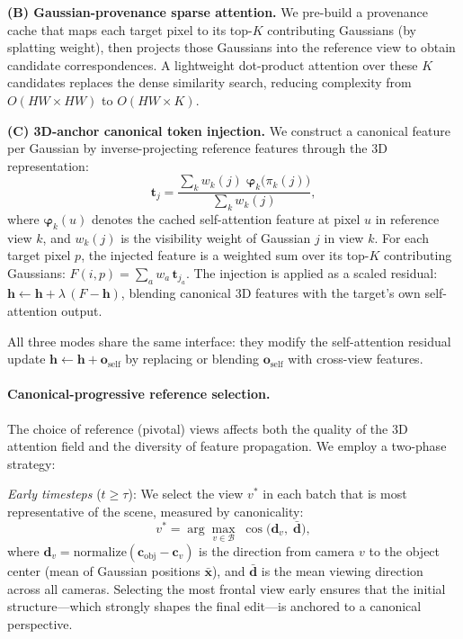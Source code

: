 \textbf{(B) Gaussian-provenance sparse attention.}
We pre-build a provenance cache that maps each target pixel to its top-$K$ contributing Gaussians (by splatting weight), then projects those Gaussians into the reference view to obtain candidate correspondences.
A lightweight dot-product attention over these $K$ candidates replaces the dense similarity search, reducing complexity from $O(HW \times HW)$ to $O(HW \times K)$.

\textbf{(C) 3D-anchor canonical token injection.}
We construct a canonical feature per Gaussian by inverse-projecting reference features through the 3D representation:
\begin{equation}
\mathbf{t}_j = \frac{\sum_{k} w_k(j) \; \boldsymbol{\varphi}_k\!\bigl(\pi_k(j)\bigr)}
                    {\sum_{k} w_k(j)},
\label{eq:canonical_token}
\end{equation}
where $\boldsymbol{\varphi}_k(u)$ denotes the cached self-attention feature at pixel $u$ in reference view $k$, and $w_k(j)$ is the visibility weight of Gaussian $j$ in view $k$.
For each target pixel $p$, the injected feature is a weighted sum over its top-$K$ contributing Gaussians:
$F(i,p) = \sum_{a} w_a \, \mathbf{t}_{j_a}$.
The injection is applied as a scaled residual:
$\mathbf{h} \leftarrow \mathbf{h} + \lambda\,(F - \mathbf{h})$,
blending canonical 3D features with the target's own self-attention output.

All three modes share the same interface: they modify the self-attention residual update $\mathbf{h} \leftarrow \mathbf{h} + \mathbf{o}_{\mathrm{self}}$ by replacing or blending $\mathbf{o}_{\mathrm{self}}$ with cross-view features.

\paragraph{Canonical-progressive reference selection.}
The choice of reference (pivotal) views affects both the quality of the 3D attention field and the diversity of feature propagation.
We employ a two-phase strategy:

\textit{Early timesteps} ($t \geq \tau$): We select the view $v^*$ in each batch that is most representative of the scene, measured by canonicality:
\begin{equation}
v^* = \arg\max_{v \in \mathcal{B}} \;\cos\!\bigl(\mathbf{d}_v,\; \bar{\mathbf{d}}\bigr),
\label{eq:canonical_score}
\end{equation}
where $\mathbf{d}_v = \mathrm{normalize}(\mathbf{c}_{\mathrm{obj}} - \mathbf{c}_v)$ is the direction from camera $v$ to the object center (mean of Gaussian positions $\bar{\mathbf{x}}$), and $\bar{\mathbf{d}}$ is the mean viewing direction across all cameras.
Selecting the most frontal view early ensures that the initial structure---which strongly shapes the final edit---is anchored to a canonical perspective.

